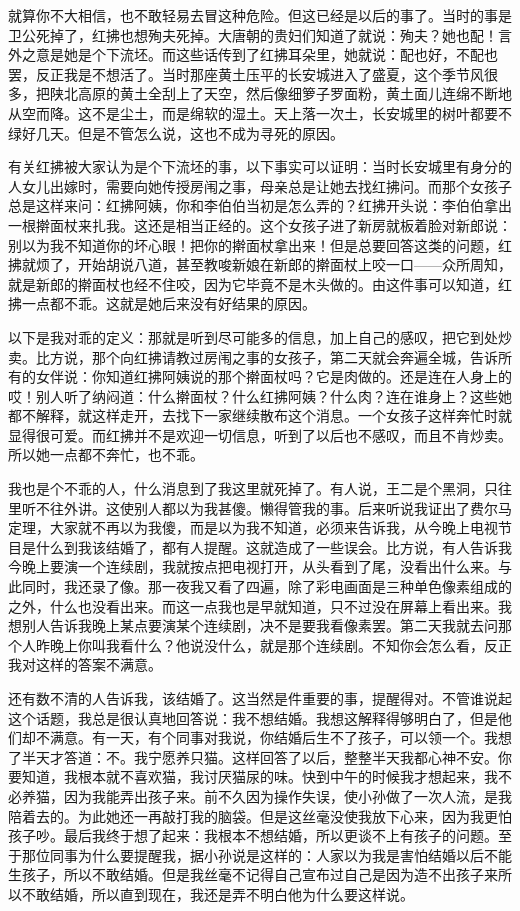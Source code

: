 就算你不大相信，也不敢轻易去冒这种危险。但这已经是以后的事了。当时的事是卫公死掉了，红拂也想殉夫死掉。大唐朝的贵妇们知道了就说：殉夫？她也配！言外之意是她是个下流坯。而这些话传到了红拂耳朵里，她就说：配也好，不配也罢，反正我是不想活了。当时那座黄土压平的长安城进入了盛夏，这个季节风很多，把陕北高原的黄土全刮上了天空，然后像细箩子罗面粉，黄土面儿连绵不断地从空而降。这不是尘土，而是绵软的湿土。天上落一次土，长安城里的树叶都要不绿好几天。但是不管怎么说，这也不成为寻死的原因。 

有关红拂被大家认为是个下流坯的事，以下事实可以证明：当时长安城里有身分的人女儿出嫁时，需要向她传授房闱之事，母亲总是让她去找红拂问。而那个女孩子总是这样来问：红拂阿姨，你和李伯伯当初是怎么弄的？红拂开头说：李伯伯拿出一根擀面杖来扎我。这还是相当正经的。这个女孩子进了新房就板着脸对新郎说：别以为我不知道你的坏心眼！把你的擀面杖拿出来！但是总要回答这类的问题，红拂就烦了，开始胡说八道，甚至教唆新娘在新郎的擀面杖上咬一口——众所周知，就是新郎的擀面杖也经不住咬，因为它毕竟不是木头做的。由这件事可以知道，红拂一点都不乖。这就是她后来没有好结果的原因。 

以下是我对乖的定义：那就是听到尽可能多的信息，加上自己的感叹，把它到处炒卖。比方说，那个向红拂请教过房闱之事的女孩子，第二天就会奔遍全城，告诉所有的女伴说：你知道红拂阿姨说的那个擀面杖吗？它是肉做的。还是连在人身上的哎！别人听了纳闷道：什么擀面杖？什么红拂阿姨？什么肉？连在谁身上？这些她都不解释，就这样走开，去找下一家继续散布这个消息。一个女孩子这样奔忙时就显得很可爱。而红拂并不是欢迎一切信息，听到了以后也不感叹，而且不肯炒卖。所以她一点都不奔忙，也不乖。 

我也是个不乖的人，什么消息到了我这里就死掉了。有人说，王二是个黑洞，只往里听不往外讲。这使别人都以为我甚傻。懒得管我的事。后来听说我证出了费尔马定理，大家就不再以为我傻，而是以为我不知道，必须来告诉我，从今晚上电视节目是什么到我该结婚了，都有人提醒。这就造成了一些误会。比方说，有人告诉我今晚上要演一个连续剧，我就按点把电视打开，从头看到了尾，没看出什么来。与此同时，我还录了像。那一夜我又看了四遍，除了彩电画面是三种单色像素组成的之外，什么也没看出来。而这一点我也是早就知道，只不过没在屏幕上看出来。我想别人告诉我晚上某点要演某个连续剧，决不是要我看像素罢。第二天我就去问那个人昨晚上你叫我看什么？他说没什么，就是那个连续剧。不知你会怎么看，反正我对这样的答案不满意。 

还有数不清的人告诉我，该结婚了。这当然是件重要的事，提醒得对。不管谁说起这个话题，我总是很认真地回答说：我不想结婚。我想这解释得够明白了，但是他们却不满意。有一天，有个同事对我说，你结婚后生不了孩子，可以领一个。我想了半天才答道：不。我宁愿养只猫。这样回答了以后，整整半天我都心神不安。你要知道，我根本就不喜欢猫，我讨厌猫尿的味。快到中午的时候我才想起来，我不必养猫，因为我能弄出孩子来。前不久因为操作失误，使小孙做了一次人流，是我陪着去的。为此她还一再敲打我的脑袋。但是这丝毫没使我放下心来，因为我更怕孩子吵。最后我终于想了起来：我根本不想结婚，所以更谈不上有孩子的问题。至于那位同事为什么要提醒我，据小孙说是这样的：人家以为我是害怕结婚以后不能生孩子，所以不敢结婚。但是我丝毫不记得自己宣布过自己是因为造不出孩子来所以不敢结婚，所以直到现在，我还是弄不明白他为什么要这样说。 

